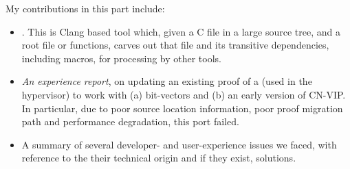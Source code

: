 My contributions in this part include:
\begin{itemize}
    \item {}. This is Clang based tool
        which, given a C file in a large source tree, and a root file or
        functions, carves out that file and its transitive dependencies,
        including macros, for processing by other tools.
    \item \emph{An experience report}, on updating an existing proof of a  (used in the  hypervisor) to work with (a)
        bit-vectors and (b) an early version of CN-VIP\@. In particular, due to
        poor source location information, poor proof migration path and
        performance degradation, this port failed.
    \item A summary of several developer- and user-experience issues we faced,
        with reference to the their technical origin and if they exist,
        solutions.
\end{itemize}

